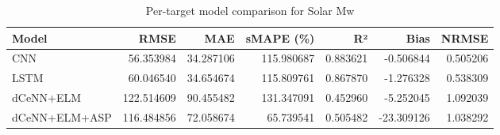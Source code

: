\begin{table}
\caption{Per-target model comparison for Solar Mw}
\begin{tabular}{lrrrrrr}
\toprule
Model & RMSE & MAE & sMAPE (\%) & R² & Bias & NRMSE \\
\midrule
CNN & 56.353984 & 34.287106 & 115.980687 & 0.883621 & -0.506844 & 0.505206 \\
LSTM & 60.046540 & 34.654674 & 115.809761 & 0.867870 & -1.276328 & 0.538309 \\
dCeNN+ELM & 122.514609 & 90.455482 & 131.347091 & 0.452960 & -5.252045 & 1.092039 \\
dCeNN+ELM+ASP & 116.484856 & 72.058674 & 65.739541 & 0.505482 & -23.309126 & 1.038292 \\
\bottomrule
\end{tabular}
\end{table}
